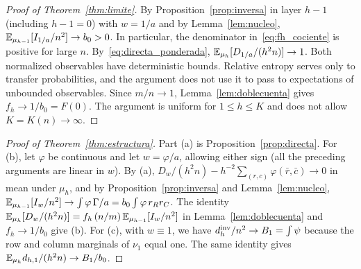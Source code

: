 \begin{proof}[Proof of Theorem~\ref{thm:limite}] By Proposition~\ref{prop:inversa} in layer $h-1$ (including
$h-1=0$) with $w=1/a$ and
by Lemma~\ref{lem:nucleo}, $\mathbb{E}_{\mu_{h-1}}[I_{1/a}/n^2]\to b_0>0$. In particular, the denominator
in~\eqref{eq:fh_cociente} is positive
for large $n$. By~\eqref{eq:directa_ponderada}, $\mathbb{E}_{\mu_h}[D_{1/a}/(h^2n)]\to1$. Both normalized
observables have deterministic
bounds. Relative entropy serves only to transfer probabilities, and the argument does not use it to pass to
expectations of unbounded
observables. Since $m/n\to1$, Lemma~\ref{lem:doblecuenta} gives $f_h\to1/b_0=F(0)$. The argument is uniform
for $1\le h\le K$ and does
not allow $K=K(n)\to\infty$. \end{proof}

\begin{proof}[Proof of Theorem~\ref{thm:estructura}] Part (a) is Proposition~\ref{prop:directa}. For (b),
let $\varphi$ be continuous and let
$w=\varphi/a$, allowing either sign (all the preceding arguments are linear in $w$). By (a),
$D_w/(h^2n)-h^{-2}\sum_{(r,c)}\varphi(\bar
r,\bar
c)\to0$ in mean under $\mu_h$, and by Proposition~\ref{prop:inversa} and Lemma~\ref{lem:nucleo},
$\mathbb{E}_{\mu_{h-1}}[I_w/n^2]\to\int
\varphi\,\Gamma/a=b_0\int\varphi\,r_Rr_C$. The identity
$\mathbb{E}_{\mu_h}[D_w/(h^2n)]=f_h\,(n/m)\,\mathbb{E}_{\mu_{h-1}}[I_w/n^2]$ in
Lemma~\ref{lem:doblecuenta} and $f_h\to1/b_0$ give (b). For (c), with $w\equiv1$, we have
$d_h^{\mathrm{inv}}/n^2\to B_1=\int\psi$ because the
row and column marginals of $\nu_1$ equal one. The same identity gives
$\mathbb{E}_{\mu_h}d_{h,1}/(h^2n)\to B_1/b_0$. \end{proof}
